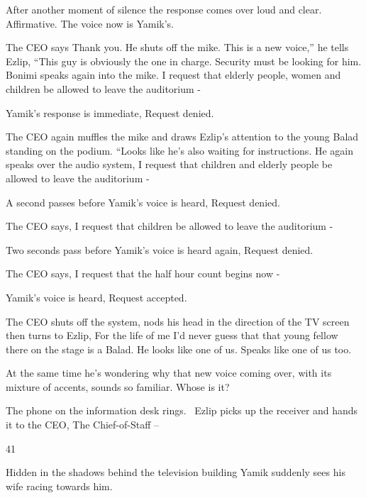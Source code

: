 \documentclass[12pt]{book}
\begin{document}
After another moment of silence the response comes over loud and clear. {\textquotedbl}Affirmative.{\textquotedbl} The
voice now is Yamik's.

The CEO says {\textquotedbl}Thank you.{\textquotedbl} He shuts off the mike. {\textquotedbl}This is a new voice,'' he
tells Ezlip, ``This guy is{ }obviously the one in charge. Security must
be{ }looking for him.{\textquotedbl} Bonimi speaks again into the{ }mike.
{\textquotedbl}I request that elderly people, women and children be allowed to leave the auditorium -{\textquotedbl}

Yamik's response is immediate, {\textquotedbl}Request denied.{\textquotedbl}

The CEO again muffles the mike and draws Ezlip's attention to the young Balad standing on the podium. ``Looks like he's
also waiting for instructions.{\textquotedbl} He again speaks over the audio system, {\textquotedbl}I request that
children and elderly people be allowed to leave the auditorium -{\textquotedbl}

A second passes before Yamik's voice is heard, {\textquotedbl}Request denied.{\textquotedbl}

The CEO says, {\textquotedbl}I request that children be allowed to leave the auditorium -{\textquotedbl}

Two seconds pass before Yamik's voice is heard again, {\textquotedbl}Request denied.{\textquotedbl}

The CEO says, {\textquotedbl}I request that the half hour count begins now -{\textquotedbl}

Yamik's voice is heard, {\textquotedbl}Request accepted.{\textquotedbl}

The CEO shuts off the system, nods his head in the direction of the TV screen then turns
to{ }Ezlip, {\textquotedbl}For the life of me I'd never guess that that young
fellow there on the stage is a Balad. He looks like one of us. Speaks like one of us too.{\textquotedbl}

At the same time he's wondering why that new voice coming over,{ }with its
mixture of accents, sounds so familiar. Whose{ }is it?

The phone on the information desk rings. \ Ezlip picks up the receiver and hands it to the CEO, {\textquotedbl}The
Chief-of-Staff --{\textquotedbl}


\bigskip

41

Hidden in the shadows behind the television building Yamik suddenly sees his wife racing towards him.
\end{document}
